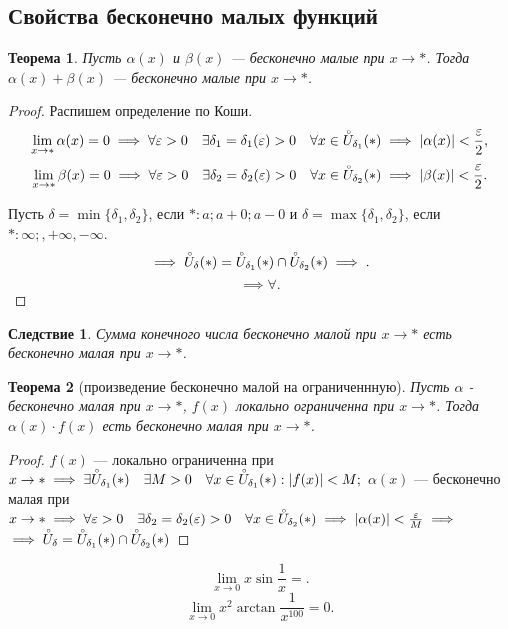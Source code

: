 \documentclass[a4paper,12pt]{article} %
\newtheorem{theorem}{Теорема}[section]
\newtheorem{corollary}{Следствие}[theorem]
\theoremstyle{remark}
\theoremstyle{definition}
\begin{document}
\subsection{Свойства бесконечно малых функций}
\begin{theorem}
	Пусть $\alpha(x)$ и  $\beta(x)$ --- бесконечно малые при $x\to *$. Тогда $\alpha(x) + \beta(x)$ --- бесконечно малые при  $x\to *$.
\end{theorem}
\begin{proof}
    Распишем определение по Коши.
	\[\lim_{x \to *} \alpha(x) = 0 \implies \forall \varepsilon> 0 \quad \exists \delta_1=\delta_1(\varepsilon)>0 \quad \forall x\in \accentset {\circ}{U}_{\delta_1}(*) \implies |\alpha(x)| < \frac{\varepsilon}{2} ,\] 
	\[\lim_{x \to *} \beta(x)  = 0 \implies \forall \varepsilon> 0 \quad \exists \delta_2=\delta_2(\varepsilon)>0 \quad \forall x\in \accentset    {\circ}{U}_{\delta_2}(*) \implies |\beta(x)| < \frac{\varepsilon}{2}	.\] 

	Пусть $\delta = \min \{\delta_1, \delta_2\} $, если $*: a; a + 0; a - 0$ и  $\delta=\max \{\delta_1, \delta_2\} $, если $*: \infty;, +\infty, -\infty$.
	\[
		\implies \accentset{\circ}{U}_\delta(*) = \accentset{\circ}{U}_{\delta_1}(*) \cap \accentset{\circ}{U}_{\delta_2}(*) \implies
	.\] 
	\[
	\implies \forall 
	.\] 
	
\end{proof}

\begin{corollary}
Сумма конечного числа бесконечно малой при $x\to *$ есть бесконечно малая при $x \to  *$.
\end{corollary}

\begin{theorem}[произведение бесконечно малой на ограниченнную]
	Пусть $\alpha$ - бесконечно малая при $x \to *$, $f(x)$ локально ограниченна при  $x\to *$. Тогда $\alpha(x)\cdot f(x)$ есть бесконечно малая при $x\to *$.
\end{theorem}
	\begin{proof}
		$f(x)$ --- локально ограниченна при $x\to * \implies \exists \accentset{\circ}{U}_{\delta_1}(*) \quad \exists M>0 \quad \forall x \in  \accentset{\circ}{U}_{\delta_1}(*) : |f(x)| < M;$
		$\alpha(x)$ --- бесконечно малая при $x \to  * \implies \forall \varepsilon> 0 \quad \exists \delta_2=\delta_2(\varepsilon)>0 \quad \forall x\in \accentset    {\circ}{U}_{\delta_2}(*) \implies |\alpha(x)| < \frac{\varepsilon}{M} \implies$
		$\implies \accentset{\circ}{U}_\delta=\accentset{\circ}{U}_{\delta_1}(*)\cap \accentset{\circ}{U}_{\delta_2}(*)$

	\end{proof}
\[
	\lim_{x \to 0} x \sin{\frac{1}{x}} = 
.\] 
\[
	\lim_{x \to 0} x^2 \arctan{\frac{1}{x^{100}}} = 0
.\] 
\end{document}
